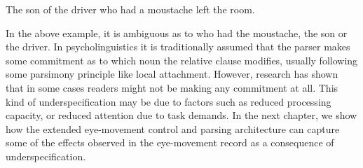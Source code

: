 \begin{exe}
\ex
The son of the driver who had a moustache left the room.
\end{exe}

In the above example, it is ambiguous as to who had the moustache, the son or the driver. In psycholinguistics it is traditionally assumed that the parser makes some commitment as to which noun the relative clause modifies, usually following some parsimony principle like local attachment. However, research has shown that in some cases readers might not be making any commitment at all. This kind of underspecification may be due to factors such as reduced processing capacity, or reduced attention due to  task demands. In the next chapter, we show how the extended eye-movement control and parsing architecture can capture some of the effects observed in the eye-movement record as a consequence of underspecification.

